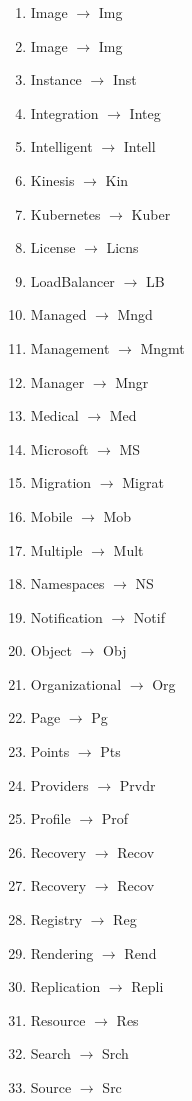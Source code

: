 \documentclass[12pt]{article}
\begin{document}
{\begin{multicols}{3}
\begin{enumerate}
    \item Image $\rightarrow$  Img
    \item Image $\rightarrow$  Img
    \item Instance $\rightarrow$  Inst
    \item Integration $\rightarrow$  Integ
    \item Intelligent $\rightarrow$  Intell
    \item Kinesis $\rightarrow$  Kin
    \item Kubernetes $\rightarrow$  Kuber
    \item License $\rightarrow$  Licns
    \item LoadBalancer $\rightarrow$  LB
    \item Managed $\rightarrow$  Mngd
    \item Management $\rightarrow$  Mngmt
    \item Manager $\rightarrow$  Mngr
    \item Medical $\rightarrow$  Med
    \item Microsoft $\rightarrow$  MS
    \item Migration $\rightarrow$  Migrat
    \item Mobile $\rightarrow$  Mob
    \item Multiple $\rightarrow$  Mult
    \item Namespaces $\rightarrow$  NS
    \item Notification $\rightarrow$  Notif
    \item Object $\rightarrow$  Obj
    \item Organizational $\rightarrow$  Org
    \item Page $\rightarrow$  Pg
    \item Points $\rightarrow$  Pts
    \item Providers $\rightarrow$  Prvdr
    \item Profile $\rightarrow$  Prof
    \item Recovery $\rightarrow$  Recov
    \item Recovery $\rightarrow$  Recov
    \item Registry $\rightarrow$  Reg
    \item Rendering $\rightarrow$  Rend
    \item Replication $\rightarrow$  Repli
    \item Resource $\rightarrow$  Res
    \item Search $\rightarrow$  Srch
    \item Source $\rightarrow$  Src

\end{enumerate}
\end{multicols}}
\end{document}
